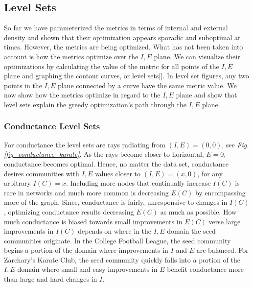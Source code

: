 \documentclass[conference]{IEEEtran}
\begin{document}
\subsection{Level Sets}
So far we have parameterized the metrics in terms of internal and external density and shown that their optimization appears sporadic and suboptimal at times.  However, the metrics are being optimized.  What has not been taken into account is how the metrics optimize over the $I,E$ plane.  We can visualize their optimizations by calculating the value of the metric for all points of the $I,E$ plane and graphing the contour curves, or level sets[].  In level set figures, any two points in the $I,E$ plane connected by a curve have the same metric value. We now show how the metrics optimize in regard to the $I,E$ plane and show that level sets explain the greedy optimization's path through the $I,E$ plane.

\subsubsection{Conductance Level Sets}
For conductance the level sets are rays radiating from $(I, E) = (0, 0)$, see {\it Fig. \ref{fig_conductance_karate}}.  As the rays become closer to horizontal, $E = 0$, conductance becomes optimal.  Hence, no matter the data set, conductance desires communities with $I,E$ values closer to $(I,E) = (x, 0)$, for any arbitrary $I(C) = x$.  Including more nodes that continually increase $I(C)$ is rare in networks and much more common is decreasing $E(C)$ by encompassing more of the graph.  Since, conductance is fairly, unresponsive to changes in $I(C)$, optimizing conductance results decreasing $E(C)$ as much as possible.  How much conductance is biased towards small improvements in $E(C)$ verse large improvements in $I(C)$ depends on where in the $I,E$ domain the seed communities originate.   In the College Football League, the seed community begins a portion of the domain where improvements in $I$ and $E$ are balanced.  For Zarchary's Karate Club, the seed community quickly falls into a portion of the $I,E$ domain where small and easy improvements in $E$ benefit conductance more than large and hard changes in $I$.
\end{document}
